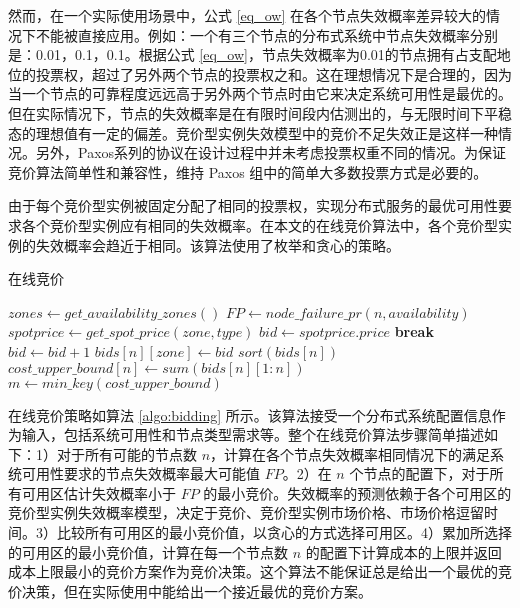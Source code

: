 然而，在一个实际使用场景中，公式 \eqref{eq_ow} 在各个节点失效概率差异较大的情况下不能被直接应用。例如：一个有三个节点的分布式系统中节点失效概率分别是：0.01，0.1，0.1。根据公式 \eqref{eq_ow}，节点失效概率为0.01的节点拥有占支配地位的投票权，超过了另外两个节点的投票权之和。这在理想情况下是合理的，因为当一个节点的可靠程度远远高于另外两个节点时由它来决定系统可用性是最优的。但在实际情况下，节点的失效概率是在有限时间段内估测出的，与无限时间下平稳态的理想值有一定的偏差。竞价型实例失效模型中的竞价不足失效正是这样一种情况。另外，Paxos系列的协议在设计过程中并未考虑投票权重不同的情况。为保证竞价算法简单性和兼容性，维持 Paxos 组中的简单大多数投票方式是必要的。

由于每个竞价型实例被固定分配了相同的投票权，实现分布式服务的最优可用性要求各个竞价型实例应有相同的失效概率。在本文的在线竞价算法中，各个竞价型实例的失效概率会趋近于相同。该算法使用了枚举和贪心的策略。

\begin{algorithm}
\caption{在线竞价}
\label{algo:bidding}
$zones\gets get\_availability\_zones()$\;
{
  $FP\gets node\_failure\_pr(n, availability)$\;
  {
    $spotprice\gets get\_spot\_price(zone, type)$\;
    $bid\gets spotprice.price$\;
    {
      {
        \textbf{break}\;
      }{
        $bid\gets bid + 1$\;
      }
    }
    $bids[n][zone]\gets bid$\;
  }
  $sort(bids[n])$\;
  $cost\_upper\_bound[n]\gets sum(bids[n][1:n])$\;
}
$m\gets min\_key(cost\_upper\_bound)$\;
\end{algorithm}

在线竞价策略如算法 \ref{algo:bidding} 所示。该算法接受一个分布式系统配置信息作为输入，包括系统可用性和节点类型需求等。整个在线竞价算法步骤简单描述如下：1）对于所有可能的节点数 $n$，计算在各个节点失效概率相同情况下的满足系统可用性要求的节点失效概率最大可能值 $FP$。2）在 $n$ 个节点的配置下，对于所有可用区估计失效概率小于 $FP$ 的最小竞价。失效概率的预测依赖于各个可用区的竞价型实例失效概率模型，决定于竞价、竞价型实例市场价格、市场价格逗留时间。3）比较所有可用区的最小竞价值，以贪心的方式选择可用区。4）累加所选择的可用区的最小竞价值，计算在每一个节点数 $n$ 的配置下计算成本的上限并返回成本上限最小的竞价方案作为竞价决策。这个算法不能保证总是给出一个最优的竞价决策，但在实际使用中能给出一个接近最优的竞价方案。

